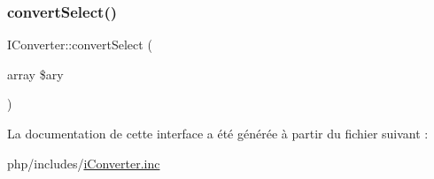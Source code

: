 \hypertarget{interface_i_converter_a5d0890843015f4f9bf962ed9ac67504c}{}\label{interface_i_converter_a5d0890843015f4f9bf962ed9ac67504c} 
\subsubsection{\texorpdfstring{convert\+Select()}{convertSelect()}}
{\footnotesize\ttfamily I\+Converter\+::convert\+Select (\begin{DoxyParamCaption}\item[{array}]{\$ary }\end{DoxyParamCaption})}



La documentation de cette interface a été générée à partir du fichier suivant \+:\begin{DoxyCompactItemize}
\item 
php/includes/\hyperlink{i_converter_8inc}{i\+Converter.\+inc}\end{DoxyCompactItemize}

